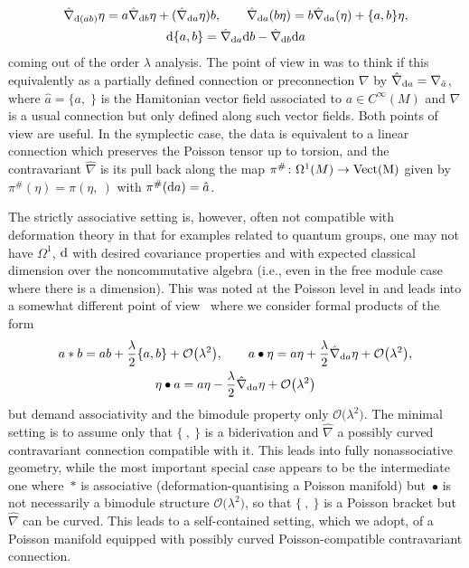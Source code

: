 \documentclass[10pt,a4paper]{amsart}
\numberwithin{equation}{section}
\newcommand{\<}{{\langle}}
\renewcommand{\>}{{\rangle}}
\newcommand{\extd}{{\rm d}}
\begin{document}
\begin{gather*} \hat\nabla_{\extd(ab)}\eta=a\hat\nabla_{\extd b}\eta+ (\hat\nabla_{\extd a}\eta) b,\qquad \hat\nabla_{\extd a}(b\eta)=b\hat\nabla_{\extd a}(\eta)+\lbrace a,b\rbrace\eta, \\
\extd\lbrace a,b\rbrace=\hat\nabla_{\extd a}\extd b-\hat\nabla_{\extd b}\extd a\end{gather*}
coming out of the order $\lambda$ analysis. The point of view in \cite{BegMa:sem,BegMa:prg} was to think if this equivalently as a partially defined connection or preconnection $\nabla$ by $\hat\nabla_{\extd a}=\nabla_{\hat a}$, where $\hat{a}=\lbrace a,\;\rbrace$ is the Hamitonian vector field associated to $a\in C^\infty(M)$ and $\nabla$ is a usual connection but only defined along such vector fields. Both points of view are useful. In the symplectic case, the data is equivalent to a linear connection which preserves the Poisson tensor up to torsion, and the contravariant $\hat \nabla$ is its pull back along the map $\pi^\#\colon \Omega^1(M)\to\rm{Vect}(M)$ given by $\pi^\#(\eta)=\pi(\eta,\ )$ with $\pi^\#(\extd a)=\hat a$.

 The strictly associative setting is, however, often not compatible with deformation theory in that for examples related to quantum groups, one may not have $\Omega^1$, $\extd$ with desired covariance properties and with expected classical dimension over the noncommutative algebra (i.e., even in the free module case where there is a dimension). This was noted at the Poisson level in \cite{BegMa:sem, Haw} and leads into a somewhat different point of view~\cite{BegMa:prg} where we consider formal products of the form
\begin{gather} a*b=ab+{\lambda\over 2}\{a,b\}+ \mathcal{O}\big(\lambda^2\big),\qquad a\bullet \eta=a\eta+{\lambda\over 2}\hat\nabla_{\extd a}\eta+\mathcal{O}\big(\lambda^2\big),\nonumber\\
 \eta\bullet a=a\eta-{\lambda\over 2}\hat\nabla_{\extd a}\eta+\mathcal{O}\big(\lambda^2\big)\label{proddef}\end{gather}
but demand associativity and the bimodule property only $\mathcal{O}\big(\lambda^2\big)$. The minimal setting is to assume only that $\{\ ,\ \}$ is a biderivation and $\hat\nabla$ a possibly curved contravariant connection compatible with it. This leads into fully nonassociative geometry, while the most important special case appears to be the intermediate one where~$*$ is associative (deformation-quantising a Poisson manifold) but~$\bullet$ is not necessarily a bimodule structure $\mathcal{O}\big(\lambda^2\big)$, so that $\{\ ,\ \}$ is a Poisson bracket but $\hat\nabla$ can be curved. This leads to a self-contained setting, which we adopt, of a Poisson manifold equipped with possibly curved Poisson-compatible contravariant connection.
\end{document}
